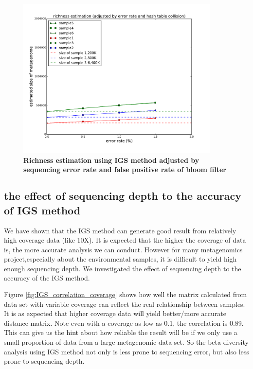 \begin{figure}[!ht]
 \centerline{\includegraphics[width=4in]{./figures/alpha_by_error_full_adjust.pdf}}
\caption{\bf Richness estimation using IGS method adjusted by sequencing error
rate and false positive rate of bloom filter}
\label{fig:IGS_richness_adjustment}
\end{figure}


\subsection{the effect of sequencing depth to the accuracy of IGS method}


We have shown that the IGS method can generate good result from relatively
high coverage data (like 10X). It is expected that the higher the coverage
of data is, the more accurate analysis we can conduct. However for many 
metagenomics project,especially about the environmental samples, it is difficult
to yield high enough sequencing depth. We investigated the effect of 
sequencing depth to the accuracy of the IGS method.


Figure \ref{fig:IGS_correlation_coverage} shows how well the matrix 
calculated from data set with variable coverage can 
reflect the real relationship between samples. It is as expected that 
higher coverage data will yield better/more accurate distance matrix.
Note even with a coverage as low as 0.1, the correlation is 0.89. 
This can  give us the hint about how reliable the result will be if 
we only use a small proportion of data from a large metagenomic data set.
So the beta diversity analysis using IGS method not only is less prone to
sequencing error, but also less prone to sequencing depth.




